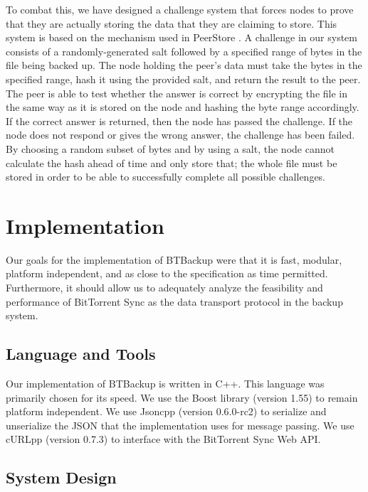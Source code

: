 \documentclass[12pt]{report}
\begin{document}
To combat this, we have designed a challenge system that forces nodes to prove that they are actually storing the data that they are claiming to store. This system is based on the mechanism used in PeerStore \cite{PeerStore}. A challenge in our system consists of a randomly-generated salt followed by a specified range of bytes in the file being backed up. The node holding the peer's data must take the bytes in the specified range, hash it using the provided salt, and return the result to the peer. The peer is able to test whether the answer is correct by encrypting the file in the same way as it is stored on the node and hashing the byte range accordingly. If the correct answer is returned, then the node has passed the challenge. If the node does not respond or gives the wrong answer, the challenge has been failed. By choosing a random subset of bytes and by using a salt, the node cannot calculate the hash ahead of time and only store that; the whole file must be stored in order to be able to successfully complete all possible challenges.


\chapter{Implementation} \label{chap:impl}

Our goals for the implementation of BTBackup were that it is fast, modular, platform independent, and as close to the specification as time permitted. Furthermore, it should allow us to adequately analyze the feasibility and performance of BitTorrent Sync as the data transport protocol in the backup system.

\section{Language and Tools}

Our implementation of BTBackup is written in C++. This language was primarily chosen for its speed. We use the Boost library (version 1.55) to remain platform independent. We use Jsoncpp (version 0.6.0-rc2) to serialize and unserialize the JSON that the implementation uses for message passing. We use cURLpp (version 0.7.3) to interface with the BitTorrent Sync Web API.

\section{System Design}
\end{document}

